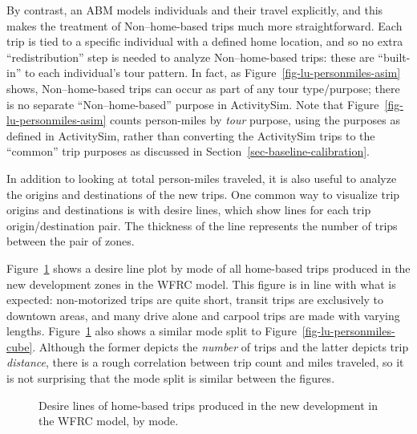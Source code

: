 \documentclass[fancy, oneside, mastersfancy, ms]{byuthesis}
\begin{document}
By contrast, an ABM models individuals and their travel explicitly, and
this makes the treatment of Non--home-based trips much more
straightforward. Each trip is tied to a specific individual with a
defined home location, and so no extra ``redistribution'' step is needed
to analyze Non--home-based trips: these are ``built-in'' to each
individual's tour pattern. In fact, as
Figure~\ref{fig-lu-personmiles-asim} shows, Non--home-based trips can
occur as part of any tour type/purpose; there is no separate
``Non--home-based'' purpose in ActivitySim. Note that
Figure~\ref{fig-lu-personmiles-asim} counts person-miles by \emph{tour}
purpose, using the purposes as defined in ActivitySim, rather than
converting the ActivitySim trips to the ``common'' trip purposes as
discussed in Section~\ref{sec-baseline-calibration}.

In addition to looking at total person-miles traveled, it is also useful
to analyze the origins and destinations of the new trips. One common way
to visualize trip origins and destinations is with desire lines, which
show lines for each trip origin/destination pair. The thickness of the
line represents the number of trips between the pair of zones.

Figure~\ref{fig-lu-desire-cube-hb} shows a desire line plot by mode of
all home-based trips produced in the new development zones in the WFRC
model. This figure is in line with what is expected: non-motorized trips
are quite short, transit trips are exclusively to downtown areas, and
many drive alone and carpool trips are made with varying lengths.
Figure~\ref{fig-lu-desire-cube-hb} also shows a similar mode split to
Figure~\ref{fig-lu-personmiles-cube}. Although the former depicts the
\emph{number} of trips and the latter depicts trip \emph{distance},
there is a rough correlation between trip count and miles traveled, so
it is not surprising that the mode split is similar between the figures.

\begin{figure}


\caption[Desire lines of home-based trips made in the WFRC
model.]{\label{fig-lu-desire-cube-hb}Desire lines of home-based trips
produced in the new development in the WFRC model, by mode.}

\end{figure}%
\end{document}

